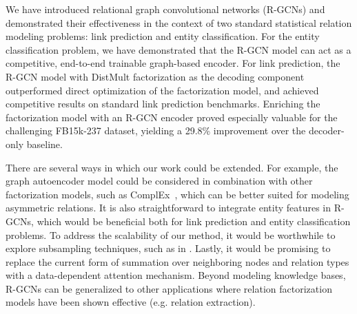 
We have introduced relational graph convolutional networks (R-GCNs) and demonstrated their effectiveness in the context of two standard statistical relation modeling problems: link prediction and entity classification. For the entity classification problem, we have demonstrated that the R-GCN model can act as a competitive, end-to-end trainable graph-based encoder. For link prediction, the R-GCN model with DistMult factorization as the decoding component outperformed direct optimization of the factorization model, and achieved competitive results on standard link prediction benchmarks. Enriching the factorization model with an R-GCN encoder proved especially valuable for the challenging FB15k-237 dataset, yielding a 29.8\% improvement over the decoder-only baseline.

There are several ways in which our work could be extended. For example, the graph autoencoder model could be considered in combination with other factorization models, such as ComplEx~\cite{complex-complex_embeddings_for_simple_link_prediction}, which can be better suited for modeling asymmetric relations. It is also straightforward to integrate entity features in R-GCNs, which would be beneficial both for link prediction and entity classification problems. To address the scalability of our method, it would be worthwhile to explore subsampling techniques, such as in \citet{hamilton2017inductive}. Lastly, it would be promising to replace the current form of summation over neighboring nodes and relation types with a data-dependent attention mechanism. Beyond modeling knowledge bases, R-GCNs can be generalized to other applications where relation factorization models have been shown effective (e.g. relation extraction). 
